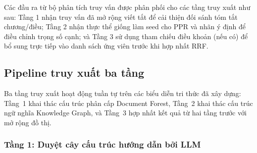\begin{table}[htbp]
  \centering
  \caption{Ví dụ phân tích truy vấn trên ba câu hỏi mẫu}
  \label{tab:query-analysis-example}
\end{table}

Các đầu ra từ bộ phân tích truy vấn được phân phối cho các tầng truy xuất như sau:
Tầng 1 nhận truy vấn đã mở rộng viết tắt để cải thiện đối sánh tóm tắt chương/điều;
Tầng 2 nhận thực thể giống làm seed cho PPR và nhãn ý định để điều chỉnh trọng số
cạnh; và Tầng 3 sử dụng tham chiếu điều khoản (nếu có) để bổ sung trực tiếp vào
danh sách ứng viên trước khi hợp nhất RRF.

\subsection{Pipeline truy xuất ba tầng}
\label{sec:pipeline-truy-xuat}

Ba tầng truy xuất hoạt động tuần tự trên các biểu diễn tri thức đã xây dựng: Tầng~1
khai thác cấu trúc phân cấp Document Forest, Tầng~2 khai thác cấu trúc ngữ nghĩa
Knowledge Graph, và Tầng~3 hợp nhất kết quả từ hai tầng trước với mở rộng đồ thị.

\subsubsection{Tầng 1: Duyệt cây cấu trúc hướng dẫn bởi LLM}
\label{subsec:tang1-duyet-cay}


